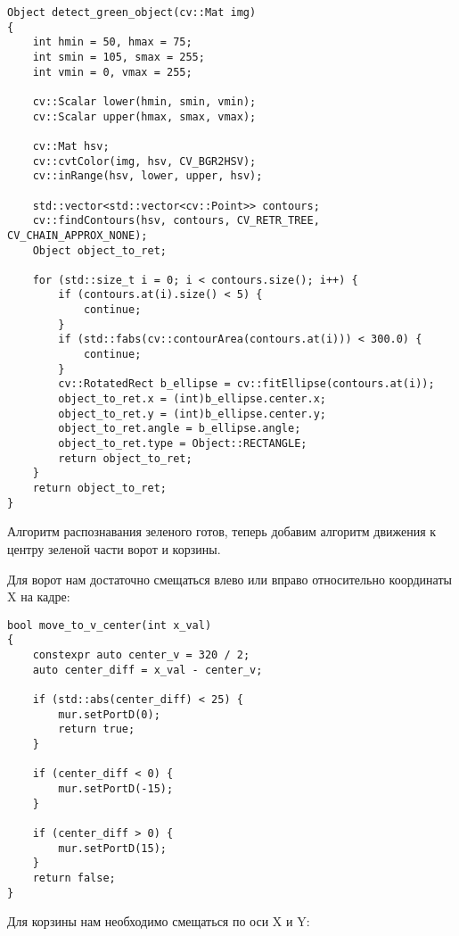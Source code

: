\begin{verbatim}
Object detect_green_object(cv::Mat img)
{
    int hmin = 50, hmax = 75;
    int smin = 105, smax = 255;
    int vmin = 0, vmax = 255;

    cv::Scalar lower(hmin, smin, vmin);
    cv::Scalar upper(hmax, smax, vmax);

    cv::Mat hsv;
    cv::cvtColor(img, hsv, CV_BGR2HSV);
    cv::inRange(hsv, lower, upper, hsv);

    std::vector<std::vector<cv::Point>> contours;
    cv::findContours(hsv, contours, CV_RETR_TREE, CV_CHAIN_APPROX_NONE);
    Object object_to_ret;

    for (std::size_t i = 0; i < contours.size(); i++) {
        if (contours.at(i).size() < 5) {
            continue;
        }
        if (std::fabs(cv::contourArea(contours.at(i))) < 300.0) {
            continue;
        }
        cv::RotatedRect b_ellipse = cv::fitEllipse(contours.at(i));
        object_to_ret.x = (int)b_ellipse.center.x;
        object_to_ret.y = (int)b_ellipse.center.y;
        object_to_ret.angle = b_ellipse.angle;
        object_to_ret.type = Object::RECTANGLE;
        return object_to_ret;
    }
    return object_to_ret;
}
\end{verbatim}

Алгоритм распознавания зеленого готов, теперь добавим алгоритм движения к центру зеленой части ворот и корзины. 

Для ворот нам достаточно смещаться влево или вправо относительно координаты X на кадре:

\begin{verbatim}
bool move_to_v_center(int x_val)
{
    constexpr auto center_v = 320 / 2;
    auto center_diff = x_val - center_v;

    if (std::abs(center_diff) < 25) {
        mur.setPortD(0);
        return true;
    }

    if (center_diff < 0) {
        mur.setPortD(-15);
    }

    if (center_diff > 0) {
        mur.setPortD(15);
    }
    return false;
}
\end{verbatim}

Для корзины нам необходимо смещаться по оси X и Y:

